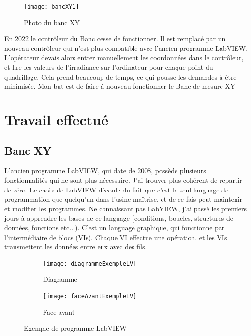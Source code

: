 \documentclass[12pt]{article}
\begin{document}
\begin{figure}[h]
	\centering
	\texttt{[image: bancXY1]}
	\caption{Photo du banc XY}
	\label{fig:bancXY1}
\end{figure}

En 2022 le contrôleur du Banc cesse de fonctionner.  
Il est remplacé par un nouveau contrôleur qui n'est plus compatible avec l'ancien programme LabVIEW.  
L'opérateur devais alors entrer manuellement les coordonnées dans le contrôleur, et lire les valeurs de l'irradiance sur l'ordinateur pour chaque point du quadrillage.  
Cela prend beaucoup de temps, ce qui pousse les demandes à être minimisée.  
Mon but est de faire à nouveau fonctionner le Banc de mesure XY.  


\section{Travail effectué}

\subsection{ Banc XY } 

L'ancien programme LabVIEW, qui date de 2008, possède plusieurs fonctionnalités qui ne sont plus nécessaire.  
J'ai trouver plus cohérent de repartir de zéro.  
Le choix de LabVIEW découle du fait que c'est le seul language de programmation que quelqu'un dans l'usine maîtrise, et de ce fais peut maintenir et modifier les programmes.  
Ne connaissant pas LabVIEW, j'ai passé les premiers jours à apprendre les bases de ce language (conditions, boucles, structures de données, fonctions etc...).  
C'est un language graphique, qui fonctionne par l'intermédiaire de blocs (VIs). Chaque VI effectue une opération, et les VIs transmettent les données entre eux avec des fils.  

\begin{figure}[h]
	\begin{subfigure}{0.5\textwidth}
		\centering
		\texttt{[image: diagrammeExempleLV]}
		\caption{Diagramme}
		\label{fig:exempleDiagramme}
	\end{subfigure}
	\begin{subfigure}{0.5\textwidth}
		\centering
		\texttt{[image: faceAvantExempleLV]}
		\caption{Face avant}
		\label{fig:exempleFaceAvant}
	\end{subfigure}

	\caption{Exemple de programme LabVIEW}
	\label{fig:exempleLabVIEW}
\end{figure}
\end{document}
